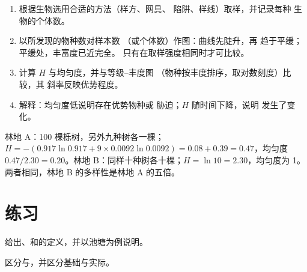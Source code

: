 \begin{method}[群落取样]\label{met:b1:ecosystem-organization:sampling}
\begin{enumerate}
  \item 根据生物选用合适的方法（样方、网具、
        陷阱、样线）取样，并记录每种
        生物的个体数。
  \item 以所发现的物种数对样本数
        （或个体数）作图：曲线先陡升，再
        趋于平缓；平缓处，丰富度已近完全。
        只有在取样强度相同时才可比较。
  \item 计算 $H$ 与均匀度，并与等级–丰度图
        （物种按丰度排序，取对数刻度）比较，其
        斜率反映优势程度。
  \item 解释：均匀度低说明存在优势物种或
        胁迫；$H$ 随时间下降，说明
        发生了变化。
\end{enumerate}
\end{method}

\begin{example}[两片林地]\label{ex:b1:ecosystem-organization:twowoods}
林地 A：100 棵栎树，另外九种树各一棵；$H = -(0.917\ln
0.917 + 9\times 0.0092\ln 0.0092) = 0.08 + 0.39 = 0.47$，均匀度
$0.47/2.30 = 0.20$。林地 B：同样十种树各十棵；$H =
\ln 10 = 2.30$，均匀度为 1。两者相同，林地 B 的多样性是林地 A 的五倍。
\end{example}

\section{练习}

\begin{exercise}[$\star$]\label{exo:b1:ecosystem-organization:1}
给出、和的定义，并以池塘为例说明。
\end{exercise}

\begin{exercise}[$\star$]\label{exo:b1:ecosystem-organization:2}
区分与，并区分基础与实际。
\end{exercise}

